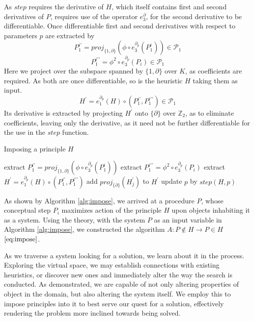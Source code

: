 \documentclass{article}
\newcommand{\dP}{\mathcal{P}}
\newcommand{\D}{\partial}
\begin{document}
As $step$ requires the derivative of $H$, which itself contains first and second derivatives of $P$, requires use of the operator $e^\D_3$, for the second derivative to be differentiable. Once differentiable first and second derivatives with respect to parameters $p$ are extracted by
\begin{equation}
P^{i\prime}_1=proj_{\{1,\D\}}\left(\phi\circ e^{\D_{p}}_3(P^i_1)\right)\in\dP_1
\end{equation}
\begin{equation}
P^{i\prime\prime}_1=\phi^2\circ e^{\D_p}_3(P_i)\in\dP_1
\end{equation}
Here we project over the subspace spanned by $\{1,\D\}$ over $K$, as coefficients are required. As both are once differentiable, so is the heuristic $H$ taking them as input.
\begin{equation}
H^\prime=e^{\D_p}_1(H)\circ(P^{i\prime}_1,P^{i\prime\prime}_1)\in\dP_1
\end{equation}
Its derivative is extracted by projecting $H^\prime$ onto $\{\D\}$ over $\mathbb{Z}_2$, as to eliminate coefficients, leaving only the derivative, as it need not be further differentiable for the use in the $step$ function.

\begin{algorithm}[h]
\caption{Imposing a principle $H$}
\label{alg:impose}
\begin{algorithmic}[1]
\State extract $P^{i\prime}_1=proj_{\{1,\D\}}\left(\phi\circ e^{\D_{p}}_3(P^i_1)\right)$
\State extract $P^{i\prime\prime}_1=\phi^2\circ e^{\D_p}_3(P_i)$
\State extract $H^\prime=e^{\D_p}_1(H)\circ(P^{i\prime}_1,P^{i\prime\prime}_1)$
\State add $proj_{\{\D\}}(H^\prime_j)$ to $H^\prime$
\EndFor
\State update $p$ by $step(H,p)$
\EndFor
\EndProcedure
\end{algorithmic}
\end{algorithm}

As shown by Algorithm \ref{alg:impose}, we arrived at a procedure $P$, whose conceptual step $P_i$ maximizes action of the principle $H$ upon objects inhabiting it as a system. Using the theory, with the system $P$ as an input variable in Algorithm \ref{alg:impose}, we constructed the algorithm $A:P\notin H\to P\in H$ $\eqref{eq:impose}$.

As we traverse a system looking for a solution, we learn about it in the process. Exploring the virtual space, we may establish connections with existing heuristics, or discover new ones and immediately alter the way the search is conducted. As demonstrated, we are capable of not only altering properties of object in the domain, but also altering the system itself. We employ this to impose principles into it to best serve our quest for a solution, effectively rendering the problem more inclined towards being solved.
\end{document}
